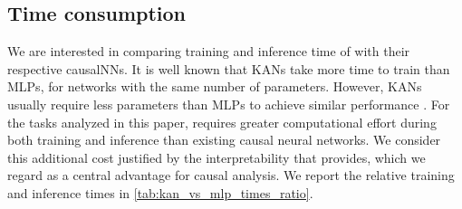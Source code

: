 
\subsection{Time consumption}

We are interested in comparing training and inference time of \ours with their respective causalNNs. It is well known that KANs take more time to train than MLPs, for networks with the same number of parameters. However, KANs usually require less parameters than MLPs to achieve similar performance \citep{liu2024kan}. For the tasks analyzed in this paper, \ours requires greater computational effort during both training and inference than existing causal neural networks. We consider this additional cost justified by the interpretability that \ours provides, which we regard as a central advantage for causal analysis. We report the relative training and inference times in \cref{tab:kan_vs_mlp_times_ratio}.


